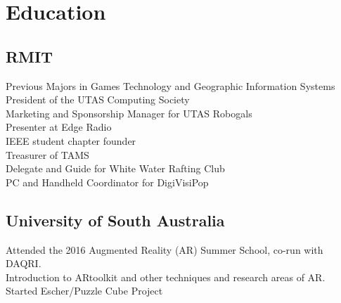 \documentclass[a4paper]{deedy-resume} %
\begin{document}
\begin{minipage}[t]{0.33\textwidth} %


\section{Education}

\subsection{RMIT}

Previous Majors in Games Technology and Geographic Information Systems \\
President of the UTAS Computing Society \\
Marketing and Sponsorship Manager for UTAS Robogals \\
Presenter at Edge Radio \\
IEEE student chapter founder \\
Treasurer of TAMS \\
Delegate and Guide for White Water Rafting Club \\
PC and Handheld Coordinator for DigiVisiPop \\

\sectionspace %



\subsection{University of South Australia}

Attended the 2016 Augmented Reality (AR) Summer School, co-run with DAQRI. \\
Introduction to ARtoolkit and other techniques and research areas of AR. \\
Started Escher/Puzzle Cube Project \\

\sectionspace %



\end{minipage}
\end{document}

